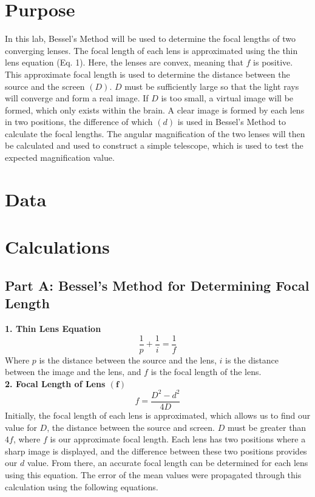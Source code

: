 \documentclass[12pt]{article}
\begin{document}

\newpage
\tableofcontents
\newpage
\section{Purpose}
In this lab, Bessel's Method will be used to determine the focal lengths of two converging lenses. 
The focal length of each lens is approximated using the thin lens equation (Eq. 1). 
Here, the lenses are convex, meaning that $f$ is positive.
This approximate focal length is used to determine the distance between the source and the screen $(D)$. 
$D$ must be sufficiently large so that the light rays will converge and form a real image. 
If $D$ is too small, a virtual image will be formed, which only exists within the brain.
A clear image is formed by each lens in two positions, the difference of which $(d)$ is used in Bessel's Method to calculate the focal lengths.
The angular magnification of the two lenses will then be calculated and used to construct a simple telescope, which is used to test the expected magnification value.  
\newpage
\section{Data}

\newpage
\section{Calculations}
\subsection*{Part A: Bessel's Method for Determining Focal Length}
\noindent \textbf{1. Thin Lens Equation}\[\frac{1}{p}+\frac{1}{i}=\frac{1}{f}\]
    Where $p$ is the distance between the source and the lens, $i$ is the distance between the image and the lens, and $f$ is the focal length of the lens. \\
\textbf{2. Focal Length of Lens $\bm{({f})}$}\[f=\frac{D^2-d^2}{4D}\]
    Initially, the focal length of each lens is approximated, which allows us to find our value for $D$, the distance between the source and screen. $D$ must be greater than $4f$, where $f$ is our approximate focal length. Each lens has two positions where a sharp image is displayed, and the difference between these two positions provides our $d$ value. From there, an accurate focal length can be determined for each lens using this equation.
    The error of the mean values were propagated through this calculation using the following equations.
\end{document}
